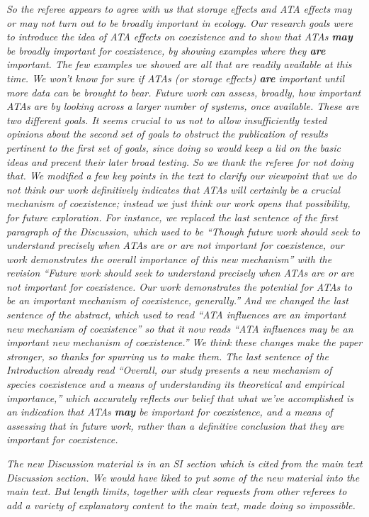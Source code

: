 \documentclass[letterpaper,11pt]{article}
\begin{document}
\emph{So the referee appears to agree with us that storage effects and ATA effects may or may not turn
out to be broadly important in ecology. Our research goals were to introduce the idea of ATA effects on
coexistence and to show that ATAs \textbf{may} be broadly important for coexistence, by showing examples where they
\textbf{are} important. The few examples we showed are all that are readily available at this time.
We won't know for sure if ATAs (or storage effects) \textbf{are} important until more data can be brought to bear. 
Future work can assess, broadly, how important ATAs are by looking across a larger number of systems, once
available. These are two different goals. It seems crucial to us not to allow insufficiently tested 
opinions about the second set of goals to obstruct the publication of results pertinent to the first set of 
goals, since doing so would keep a lid on the basic ideas and precent their later broad testing.
So we thank the referee for not doing that. We modified a few key points in the text to clarify 
our viewpoint that we do not think our work definitively indicates that ATAs will certainly be a crucial
mechanism of coexistence; instead we just think our work opens that possibility, for future exploration.
For instance, we replaced the last sentence of the first paragraph of the Discussion, which used to be
``Though future work should seek to understand precisely when ATAs are or are not important
for coexistence, our work demonstrates the overall importance of this new mechanism'' with the revision
``Future work should seek to understand precisely when ATAs are or are not important
for coexistence. Our work demonstrates the potential for ATAs to be an important mechanism of coexistence, generally.''
And we changed the last sentence of the abstract, which used to read ``ATA influences are an important new 
mechanism of coexistence'' so that it now reads ``ATA influences may be an important new mechanism of coexistence.''
We think these changes make the paper stronger, so thanks for spurring us to make them. The last
sentence of the Introduction already read ``Overall, our study presents a new mechanism of species coexistence
and a means of understanding its theoretical and empirical importance,'' which accurately reflects our belief
that what we've accomplished is an indication that ATAs \textbf{may} be important for coexistence, 
and a means of assessing
that in future work, rather than a definitive conclusion that they are important for coexistence.}

\emph{The new Discussion material is in an SI section which is cited from the main text Discussion section. 
We would have liked to put some of the new material into the main text. But length limits, together with
clear requests from other referees to add a variety of explanatory content to the main text, made doing so impossible.} \\
\end{document}
